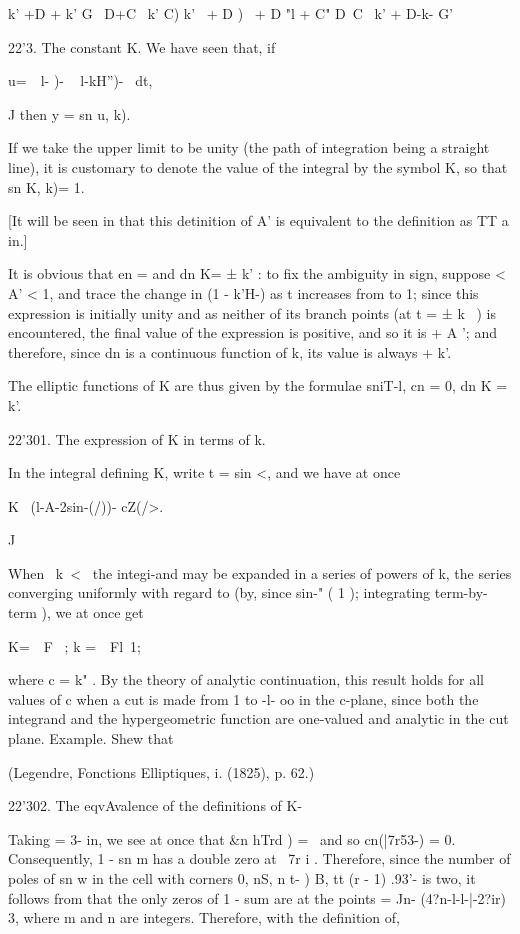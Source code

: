 k' +D + k' G \ D+C \ k' C) k' \ + D ) \ + D "l + C" D~C ~k' + D-k- G'


22'3. The constant K. We have seen that, if

u=\ \ l- )- ~ l-kH'')- ~dt,

J then y = sn u, k).

If we take the upper limit to be unity (the path of integration being
a straight line), it is customary to denote the value of the integral
by the symbol K, so that sn K, k)= 1.

[It will be seen in that this detinition of A' is equivalent
to the definition as TT a in.]

%
%

It is obvious that en = and dn K= ± k' : to fix the ambiguity in sign,
suppose < A' < 1, and trace the change in (1 - k'H-) as t increases
from to 1; since this expression is initially unity and as neither of
its branch points (at t = ± k~ ) is encountered, the final value of
the expression is positive, and so it is + A '; and therefore, since
dn is a continuous function of k, its value is always + k'.

The elliptic functions of K are thus given by the formulae sniT-l, cn
= 0, dn K = k'.

22'301. The expression of K in terms of k.

In the integral defining K, write t = sin <, and we have at once

K \ (l-A-2sin-(/))- cZ(/>.

J

When \ k\ < \, the integi-and may be expanded in a series of powers of
k, the series converging uniformly with regard to (by, since
sin-" ( 1 ); integrating term-by-term ), we at once get

K=\ \ F \, ; k =\ \ Fl\, 1;

where c = k" . By the theory of analytic continuation, this result
holds for all values of c when a cut is made from 1 to -l- oo in the
c-plane, since both the integrand and the hypergeometric function are
one-valued and analytic in the cut plane. Example. Shew that

(Legendre, Fonctions Elliptiques, i. (1825), p. 62.)

22'302. The eqvAvalence of the definitions of K-

Taking = 3- in, we see at once that \&n hTrd ) = \ and so
cn(|7r53-) = 0. Consequently, 1 - sn m has a double zero at \ 7r i .
Therefore, since the number of poles of sn w in the cell with corners
0, nS, n t- ) B, tt (r - 1) .93'- is two, it follows from
that the only zeros of 1 - sum are at the points = Jn-
(4?n-l-l-|-2?ir) 3, where m and n are integers. Therefore, with the
definition of,

